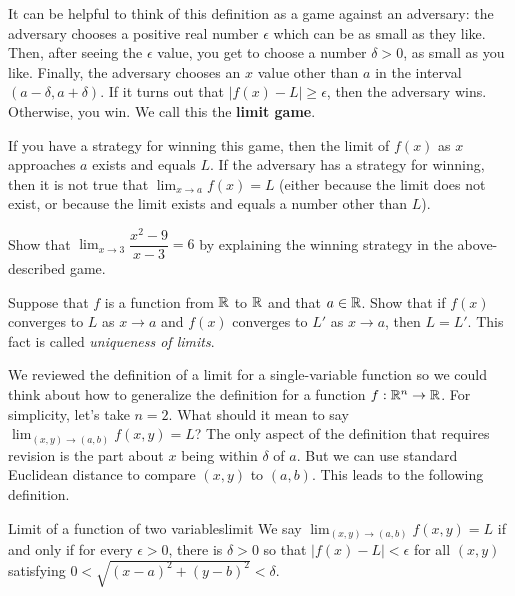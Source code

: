 \documentclass[svgnames]{report}
\begin{document}
It can be helpful to think of this definition as a game against an
adversary: the adversary chooses a positive real number $\epsilon$
which can be as small as they like. Then, after seeing the $\epsilon$
value, you get to choose a number $\delta>0$, as small as you
like. Finally, the adversary chooses an $x$ value other than $a$ in
the interval $(a-\delta, a + \delta)$. If it turns out that $|f(x) -
L| \geq \epsilon$, then the adversary wins. Otherwise, you win. We
call this the \textbf{limit game}. 

If you have a strategy for winning this game, then the limit of $f(x)$
as $x$ approaches $a$ exists and equals $L$. If the adversary has a
strategy for winning, then it is not true that $\lim_{x \to a} f(x) =
L$ (either because the limit does not exist, or because the limit
exists and equals a number other than $L$).

\begin{exercise}{}{}
  Show that $\displaystyle{\lim_{x \to 3}}\dfrac{x^2 - 9}{x - 3} = 6$ by explaining
  the winning strategy in the above-described game. 
\end{exercise}

\begin{exercise}{}{}
  Suppose that $f$ is a function from $\mathbb{R}$ to $\mathbb{R}$ and that
  $a \in \mathbb{R}$. Show that if $f(x)$ converges to $L$ as $x\to a$ and
  $f(x)$ converges to $L'$ as $x\to a$, then $L = L'$. This fact is called
  \textit{uniqueness of limits}. 
\end{exercise}

We reviewed the definition of a limit for a single-variable function
so we could think about how to generalize the definition for a
function $f:\mathbb{R}^n \to \mathbb{R}$. For simplicity, let's take $n = 2$. What
should it mean to say
$\displaystyle{\lim_{(x,y) \to (a,b)} f(x,y)} = L$? The only aspect of 
the definition that requires revision is the part about $x$ being
within $\delta$ of $a$. But we can use standard Euclidean distance to
compare $(x,y)$ to $(a,b)$. This leads to the following definition. 

\begin{defn}{Limit of a function of two variables}{limit}
  We say $\lim_{(x,y)\to (a,b)} f(x,y) = L$ if and only if for every
  $\epsilon > 0$, there is $\delta>0$ so that $|f(x) - L| < \epsilon$
  for all $(x,y)$ satisfying $0 < \sqrt{(x -a)^2 + (y-b)^2} < \delta$. 
\end{defn}
\end{document}
